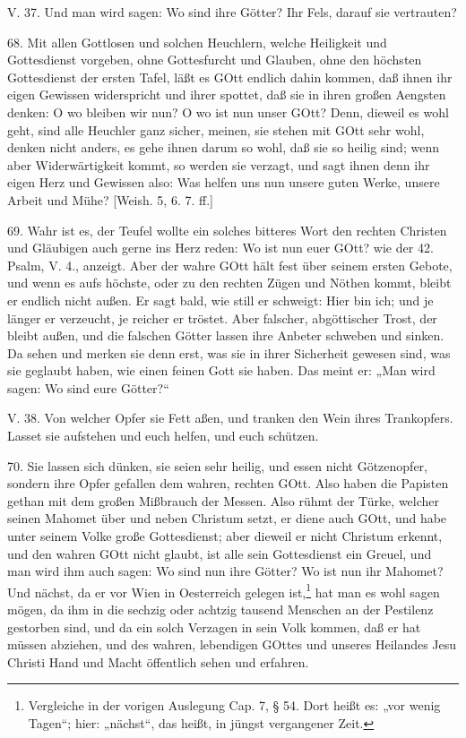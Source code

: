 \begin{schriftzitat}
V. 37. Und man wird sagen: Wo sind ihre Götter? Ihr Fels, darauf sie vertrauten?
\end{schriftzitat}

68. Mit allen Gottlosen und solchen Heuchlern, welche Heiligkeit und Gottesdienst vorgeben, ohne Gottesfurcht und Glauben, ohne den höchsten Gottesdienst der ersten Tafel, läßt es GOtt endlich dahin kommen, daß ihnen ihr eigen Gewissen widerspricht und ihrer spottet, daß sie in ihren großen Aengsten denken: O wo bleiben wir nun? O wo ist nun unser GOtt? Denn, dieweil es wohl geht, sind alle Heuchler ganz sicher, meinen, sie stehen mit GOtt sehr wohl, denken nicht anders, es gehe ihnen darum so wohl, daß sie so heilig sind; wenn aber Widerwärtigkeit kommt, so werden sie verzagt, und sagt ihnen denn ihr eigen Herz und Gewissen also: Was helfen uns nun unsere guten Werke, unsere Arbeit und Mühe? [Weish. 5, 6. 7. ff.]

69. Wahr ist es, der Teufel wollte ein solches bitteres Wort den rechten Christen und Gläubigen auch gerne ins Herz reden: Wo ist nun euer GOtt? wie der 42. Psalm, V. 4., anzeigt. Aber der wahre GOtt hält fest über seinem ersten Gebote, und wenn es aufs höchste, oder zu den rechten Zügen und Nöthen kommt, bleibt er endlich nicht außen. Er sagt bald, wie still er schweigt: Hier bin ich; und je länger er verzeucht, je reicher er tröstet. Aber falscher, abgöttischer Trost, der bleibt außen, und die falschen Götter lassen ihre Anbeter schweben und sinken. Da sehen und merken sie denn erst, was sie in ihrer Sicherheit gewesen sind, was sie geglaubt haben, wie einen feinen Gott sie haben. Das meint er: „Man wird sagen: Wo sind eure Götter?“

\begin{schriftzitat}
V. 38. Von welcher Opfer sie Fett aßen, und tranken den Wein ihres Trankopfers. Lasset sie aufstehen und euch helfen, und euch schützen.
\end{schriftzitat}

70. Sie lassen sich dünken, sie seien sehr heilig, und essen nicht Götzenopfer, sondern ihre Opfer gefallen dem wahren, rechten GOtt. Also haben die Papisten gethan mit dem großen Mißbrauch der Messen. Also rühmt der Türke, welcher seinen Mahomet über und neben Christum setzt, er diene auch GOtt, und habe unter seinem Volke große Gottesdienst; aber dieweil er nicht Christum erkennt, und den wahren GOtt nicht glaubt, ist alle sein Gottesdienst ein Greuel, und man wird ihm auch sagen: Wo sind nun ihre Götter? Wo ist nun ihr Mahomet? Und nächst, da er vor Wien in Oesterreich gelegen ist,\footnote{Vergleiche in der vorigen Auslegung Cap. 7, § 54. Dort heißt es: „vor wenig Tagen“; hier: „nächst“, das heißt, in jüngst vergangener Zeit.} hat man es wohl sagen mögen, da ihm in die sechzig oder achtzig tausend Menschen an der Pestilenz gestorben sind, und da ein solch Verzagen in sein Volk kommen, daß er hat müssen abziehen, und des wahren, lebendigen GOttes und unseres Heilandes Jesu Christi Hand und Macht öffentlich sehen und erfahren.

